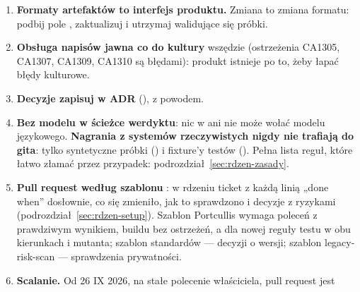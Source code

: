 \begin{enumerate}
\begin{lstlisting}
./scripts/scan-secrets.sh         # skan sekretów jak w CI; z --staged: jak hook
\end{lstlisting}
        a \texttt{./scripts/setup.sh --check} tylko raportuje braki. W pozostałych
        repozytoriach: Portcullis --- build bez ostrzeżeń, testy, Stryker.NET dla reguł
        migracyjnych i zasady baseline (podrozdział~\ref{sec:portcullis-wklad}); standardy
        --- , , testy
        i 
        (podrozdział~\ref{sec:standardy-procedura-zmiany}); bench --- PSScriptAnalyzer
        z ustawieniami repozytorium i skrypty tylko w ASCII
        (podrozdział~\ref{sec:bench-higiena}); legacy-risk-scan --- ,
         i 
        (podrozdział~\ref{sec:risk-scan-lokalnie}) oraz dwa jednorazowe ustawienia
        repozytorium (podrozdziały~\ref{sec:risk-scan-deploy} i \ref{sec:risk-scan-ci}).
  \item \textbf{Formaty artefaktów to interfejs produktu.} Zmiana 
        to zmiana formatu: podbij pole , zaktualizuj  i
        utrzymaj walidujące się próbki.
  \item \textbf{Obsługa napisów jawna co do kultury} wszędzie (ostrzeżenia CA1305, CA1307,
        CA1309, CA1310 są błędami): produkt istnieje po to, żeby łapać błędy kulturowe.
  \item \textbf{Decyzje zapisuj w ADR} (), z powodem.
  \item \textbf{Bez modelu w ścieżce werdyktu}: nic w  ani
         nie może wołać modelu językowego. \textbf{Nagrania
        z systemów rzeczywistych nigdy nie trafiają do gita}: tylko syntetyczne próbki
        () i fixture'y testów (). Pełna lista
        reguł, które łatwo złamać przez przypadek: podrozdział~\ref{sec:rdzen-zasady}.
  \item \textbf{Pull request według szablonu} :
        w rdzeniu ticket z każdą linią „done when” dosłownie, co się zmieniło, jak to
        sprawdzono i decyzje z ryzykami (podrozdział~\ref{sec:rdzen-setup}). Szablon
        Portcullis wymaga poleceń z prawdziwym wynikiem, buildu bez ostrzeżeń, a dla nowej
        reguły testu w obu kierunkach i mutanta; szablon standardów --- decyzji o wersji;
        szablon legacy-risk-scan --- sprawdzenia prywatności.
  \item \textbf{Scalanie.} Od 26 IX 2026, na stałe polecenie właściciela, pull request jest

\end{enumerate}
